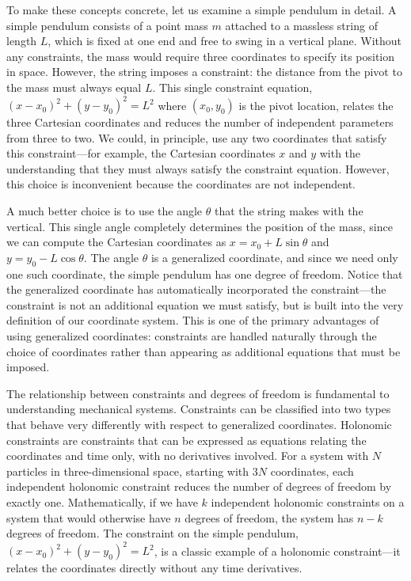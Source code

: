 To make these concepts concrete, let us examine a simple pendulum in detail. A simple pendulum consists of a point mass $m$ attached to a massless string of length $L$, which is fixed at one end and free to swing in a vertical plane. Without any constraints, the mass would require three coordinates to specify its position in space. However, the string imposes a constraint: the distance from the pivot to the mass must always equal $L$. This single constraint equation, $(x - x_0)^2 + (y - y_0)^2 = L^2$ where $(x_0, y_0)$ is the pivot location, relates the three Cartesian coordinates and reduces the number of independent parameters from three to two. We could, in principle, use any two coordinates that satisfy this constraint—for example, the Cartesian coordinates $x$ and $y$ with the understanding that they must always satisfy the constraint equation. However, this choice is inconvenient because the coordinates are not independent.

A much better choice is to use the angle $\theta$ that the string makes with the vertical. This single angle completely determines the position of the mass, since we can compute the Cartesian coordinates as $x = x_0 + L\sin\theta$ and $y = y_0 - L\cos\theta$. The angle $\theta$ is a generalized coordinate, and since we need only one such coordinate, the simple pendulum has one degree of freedom. Notice that the generalized coordinate has automatically incorporated the constraint—the constraint is not an additional equation we must satisfy, but is built into the very definition of our coordinate system. This is one of the primary advantages of using generalized coordinates: constraints are handled naturally through the choice of coordinates rather than appearing as additional equations that must be imposed.

The relationship between constraints and degrees of freedom is fundamental to understanding mechanical systems. Constraints can be classified into two types that behave very differently with respect to generalized coordinates. Holonomic constraints are constraints that can be expressed as equations relating the coordinates and time only, with no derivatives involved. For a system with $N$ particles in three-dimensional space, starting with $3N$ coordinates, each independent holonomic constraint reduces the number of degrees of freedom by exactly one. Mathematically, if we have $k$ independent holonomic constraints on a system that would otherwise have $n$ degrees of freedom, the system has $n - k$ degrees of freedom. The constraint on the simple pendulum, $(x - x_0)^2 + (y - y_0)^2 = L^2$, is a classic example of a holonomic constraint—it relates the coordinates directly without any time derivatives.

